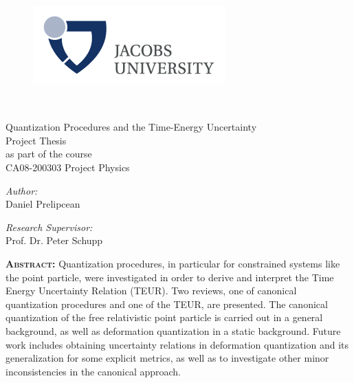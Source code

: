 \documentclass[a4paper,10pt]{article}
\numberwithin{equation}{section}
\begin{document}



\begin{titlepage}
 
\begin{center}
 
\begin{figure}[H]
\raggedleft
\includegraphics[width=0.3\linewidth]{jacobslogo.jpg}
\end{figure}
\LARGE
{} \\
 
\vspace{25mm}
\huge{Quantization Procedures and the Time-Energy Uncertainty} \\
 
\vspace{15mm}
\Large{Project Thesis}\\
\vspace{2mm}
\large{as part of the course}\\
\vspace{2mm}
\large{CA08-200303 Project Physics}\\
\vspace{7.5mm}


\end{center}

 \begin{minipage}{0.4\textwidth}
\begin{flushleft} 
\textit{Author:} \\
\large{Daniel Prelipcean}

\end{flushleft}
\end{minipage}
\hfill
\begin{minipage}{0.4\textwidth}
\begin{flushright} 
\textit{Research Supervisor:} \\
\large Prof. Dr. Peter Schupp
\end{flushright}
\end{minipage}
 
 \begin{center}
\large{\textbf{\textsc{Abstract:}}}
\justify
Quantization procedures, in particular for constrained systems like the point particle, were investigated in order to derive and interpret the Time Energy Uncertainty Relation (TEUR). Two reviews, one of canonical quantization procedures and one of the TEUR, are presented. The canonical quantization of the free relativistic point particle is carried out in a general background, as well as deformation quantization in a static background. Future work includes obtaining uncertainty relations in deformation quantization and its generalization for some explicit metrics, as well as to investigate other minor inconsistencies in the canonical approach.
\end{center}
 

\end{titlepage}
\end{document}
